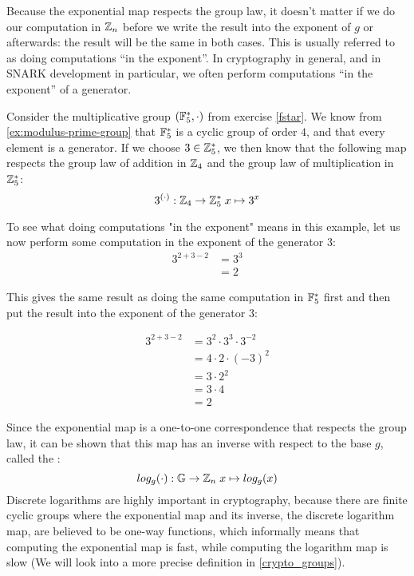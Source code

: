 Because the exponential map respects the group law, it doesn't matter if we do our computation in $\mathbb{Z}_n$ before we write the result into the exponent of $g$ or afterwards: the result will be the same in both cases. This is usually referred to as doing computations ``in the exponent''. In cryptography in general, and in SNARK development in particular, we often perform computations ``in the exponent'' of a generator.
\begin{example}\label{ex:in-the-exponent} Consider the multiplicative group $(\mathbb{F}_{5}^*,\cdot)$ from exercise \ref{fstar}. We know from \ref{ex:modulus-prime-group} that $\mathbb{F}_{5}^*$ is a cyclic group of order $4$, and that every element is a generator. If we choose $3\in\mathbb{Z}_5^*$, we then know that the following map respects the group law of addition in $\mathbb{Z}_4$ and the group law of multiplication in $\mathbb{Z}_5^*$:
$$
3^{(\cdot)}: \mathbb{Z}_4 \to \mathbb{Z}_5^* \; x \mapsto 3^x
$$

To see what doing computations "in the exponent" means in this example, let us now perform some computation in the exponent of the generator $3$:
\begin{align*}
3^{2+3-2} &=3^{3}\\
          & = 2
\end{align*}

This gives the same result as doing the same computation in $\mathbb{F}^*_5$ first and then put the result into the exponent of the generator $3$:

\begin{align*}
3^{2+3-2} &= 3^2 \cdot 3^3 \cdot 3^{-2}\\
          &= 4\cdot 2 \cdot (-3)^2\\
          &= 3\cdot 2^2\\
          &= 3\cdot 4 \\
          &= 2
\end{align*}

\end{example}
Since the exponential map is a one-to-one correspondence that respects the group law, it can be shown that this map has an inverse with respect to the base $g$, called the :
\begin{equation}
log_g(\cdot): \mathbb{G} \to \mathbb{Z}_n\; x \mapsto log_g(x)
\end{equation}
Discrete logarithms are highly important in cryptography, because there are finite cyclic groups where the exponential map and its inverse, the discrete logarithm map, are believed to be one-way functions, which informally means that computing the exponential map is fast, while computing the logarithm map is slow (We will look into a more precise definition in \ref{crypto_groups}).

